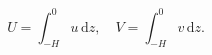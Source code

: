 \begin{equation}
    U=\int_{-H}^0 u \, \text{d}z,\quad V=\int_{-H}^0 v \, \text{d}z.
\label{EQN:UVInt}
\end{equation}
